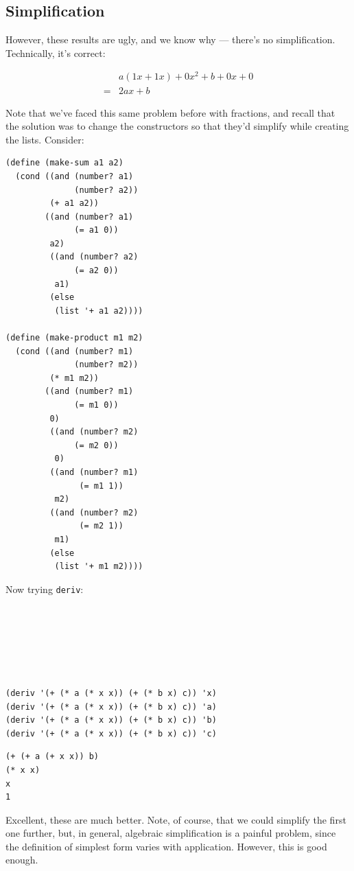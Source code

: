 \documentclass[9pt]{report}
\begin{document}
\subsection{Simplification}
\label{sec:org161fd9e}

However, these results are ugly, and we know why --- there's no
simplification. Technically, it's correct:

\begin{align*}
&a(1x+1x) + 0x^{2} + b + 0x + 0\\
=& 2ax + b
\end{align*}

Note that we've faced this same problem before with fractions, and
recall that the solution was to change the constructors so that
they'd simplify while creating the lists. Consider:

\begin{verbatim}
(define (make-sum a1 a2)
  (cond ((and (number? a1)
              (number? a2))
         (+ a1 a2))
        ((and (number? a1)
              (= a1 0))
         a2)
         ((and (number? a2)
              (= a2 0))
          a1)
         (else
          (list '+ a1 a2))))

(define (make-product m1 m2)
  (cond ((and (number? m1)
              (number? m2))
         (* m1 m2))
        ((and (number? m1)
              (= m1 0))
         0)
         ((and (number? m2)
              (= m2 0))
          0)
         ((and (number? m1)
               (= m1 1))
          m2)
         ((and (number? m2)
               (= m2 1))
          m1)
         (else
          (list '+ m1 m2))))
\end{verbatim}

Now trying \texttt{deriv}:


\begin{verbatim}






(deriv '(+ (* a (* x x)) (+ (* b x) c)) 'x)
(deriv '(+ (* a (* x x)) (+ (* b x) c)) 'a)
(deriv '(+ (* a (* x x)) (+ (* b x) c)) 'b)
(deriv '(+ (* a (* x x)) (+ (* b x) c)) 'c)
\end{verbatim}

\begin{verbatim}
(+ (+ a (+ x x)) b)
(* x x)
x
1
\end{verbatim}


Excellent, these are much better. Note, of course, that we could
simplify the first one further, but, in general, algebraic
simplification is a painful problem, since the definition of
simplest form varies with application. However, this is good
enough.
\end{document}
